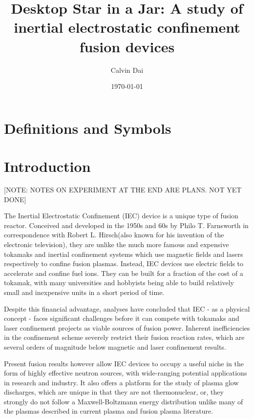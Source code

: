 \documentclass[a4paper,titlepage]{article}
\title{Desktop Star in a Jar: A study of inertial electrostatic confinement fusion devices}
\author{Calvin Dai}
\date{\today}
\let\cite\parencite
\begin{document}
 
\maketitle

\tableofcontents
\newpage
\newpage
\begin{flushleft}

\section{Definitions and Symbols}



\section{Introduction}
\label{intro}
[NOTE: NOTES ON EXPERIMENT AT THE END ARE PLANS. NOT YET DONE]

The Inertial Electrostatic Confinement (IEC) device is a unique type of fusion reactor. Conceived and developed in the 1950s and 60s by Philo T. Farnsworth in correspondence with Robert L. Hirsch(also known for his invention of the electronic television), they are unlike the much more famous and expensive tokamaks and inertial confinement systems which use magnetic fields and lasers respectively to confine fusion plasmas. Instead, IEC devices use electric fields to accelerate and confine fuel ions. They can be built for a fraction of the cost of a tokamak, with many universities and hobbyists being able to build relatively small and inexpensive units in a short period of time. \newline

Despite this financial advantage, analyses have concluded that IEC - as a physical concept - faces significant challenges before it can compete with tokamaks and laser confinement projects as viable sources of fusion power.  Inherent inefficiencies in the confinement scheme severely restrict their fusion reaction rates, which are several orders of magnitude below magnetic and laser confinement results. \cite{rider_1995_a}\cite{miley_2013_inertial} \newline

Present fusion results however allow IEC devices to occupy a useful niche in the form of highly effective neutron sources, with wide-ranging potential applications in research and industry. It also offers a platform for the study of plasma glow discharges, which are unique in that they are not thermonuclear, or, they strongly do not follow a Maxwell-Boltzmann energy distribution unlike many of the plasmas described in current plasma and fusion plasma literature.\newline 



\end{flushleft}
\end{document}
